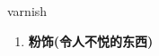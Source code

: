 
\begin{frame}
{\huge varnish}
\begin{center}
\begin{enumerate}\Large
  \item \textbf{粉饰(令人不悦的东西)}
\end{enumerate}
\end{center}
\end{frame}
